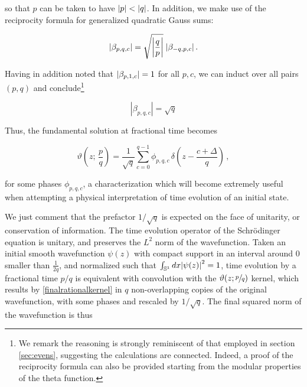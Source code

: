 \documentclass{article}
\begin{document}
so that $p$ can be taken to have $\abs{p} < \abs{q}$. In addition, we make use of the reciprocity formula for generalized quadratic Gauss sums\cite{berndt_gauss}:

\begin{equation}
    \abs{\beta_{p,q,c}} = \sqrt{\abs{\frac{q}{p}}} \; \abs{\beta_{-q,p,c}}\,.
\end{equation}

Having in addition noted that $\abs{\beta_{p,1,c}} = 1$ for all $p,c$, we can induct over all pairs $(p,q)$ and conclude\footnote{We remark the reasoning is strongly reminiscent of that employed in section \ref{sec:evens}, suggesting the calculations are connected. Indeed, a proof of the reciprocity formula can also be provided starting from the modular properties of the theta function\cite{berndt_gauss}.}

\begin{equation}
    |\beta_{p,q,c}| = \sqrt{q}
\end{equation}

%
%


Thus, the fundamental solution at fractional time becomes

\begin{equation}\label{finalrationalkernel}
    \vartheta\left( z ; \,\frac{p}{q} \right) = \frac{1}{\sqrt{q}} \sum_{c=0}^{q-1} \phi_{p,q,c} \, \delta \left(z-\frac{c+\Delta}{q}\right)\,,
\end{equation}

for some phases $\phi_{p,q,c}$, a characterization which will become extremely useful when attempting a physical interpretation of time evolution of an initial state.

We just comment that the prefactor $1/\sqrt{q}$ is expected on the face of unitarity, or conservation of information. The time evolution operator of the Schr\"odinger equation is unitary, and preserves the $L^2$ norm of the wavefunction. Taken an initial smooth wavefunction $\psi(z)$ with compact support in an interval around $0$ smaller than $\frac{1}{2q}$, and normalized such that $\int_{\mathbb{S}^1} dx \abs{\psi(z)}^2 = 1$, time evolution by a fractional time $p/q$ is equivalent with convolution with the $\vartheta(z;\sfrac{p}{q})$ kernel, which results by \eqref{finalrationalkernel} in $q$ non-overlapping copies of the original wavefunction, with some phases and rescaled by $1/\sqrt{q}$. The final squared norm of the wavefunction is thus
\end{document}
